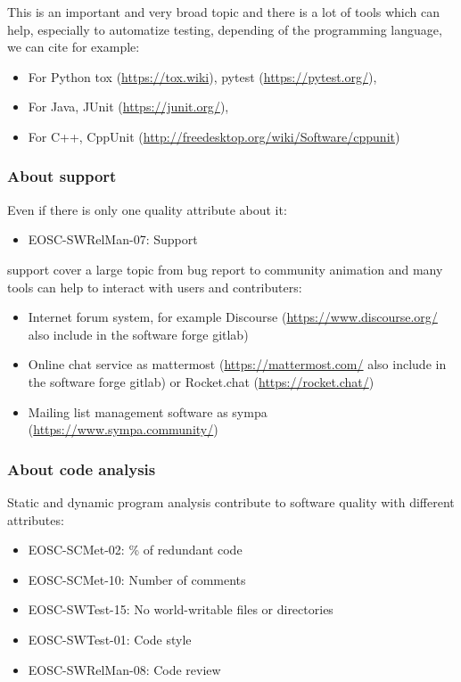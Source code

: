 This is an important and very broad topic and there is a lot of tools
which can help, especially to automatize testing, depending of the
programming language, we can cite for example:

\begin{itemize}
\item For Python tox
  (\url{https://tox.wiki}), pytest (\url{https://pytest.org/}),
\item For Java, JUnit (\url{https://junit.org/}),
\item For C++, CppUnit (\url{http://freedesktop.org/wiki/Software/cppunit})
\end{itemize}

\subsubsection{About support}

Even if there is only one quality attribute about it: 

\begin{itemize}
  \item EOSC-SWRelMan-07: Support
\end{itemize}

support cover a large topic from bug report to community animation and
many tools can help to interact with users and contributers:

\begin{itemize}
\item Internet forum system, for example Discourse
  (\url{https://www.discourse.org/} also include in the software
  forge gitlab)
\item Online chat service as mattermost (\url{https://mattermost.com/} also include in the software
  forge gitlab) or Rocket.chat (\url{https://rocket.chat/})
\item Mailing list management software as sympa
  (\url{https://www.sympa.community/})
\end{itemize}

\subsubsection{About code analysis}

Static and dynamic program analysis contribute to software quality
with different attributes:
\begin{itemize}
  \item EOSC-SCMet-02: \% of redundant code
  \item EOSC-SCMet-10: Number of comments
  \item EOSC-SWTest-15: No world-writable files or directories
  \item EOSC-SWTest-01: Code style
  \item EOSC-SWRelMan-08: Code review
\end{itemize}

